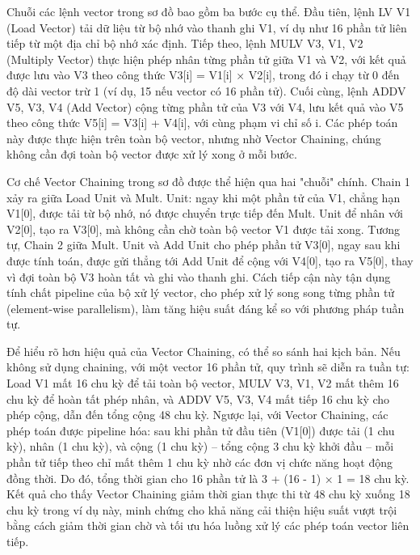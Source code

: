 \documentclass[a4paper]{article}
\begin{document}
Chuỗi các lệnh vector trong sơ đồ bao gồm ba bước cụ thể. Đầu tiên, lệnh LV V1 (Load Vector) tải dữ liệu từ bộ nhớ vào thanh ghi V1, ví dụ như 16 phần tử liên tiếp từ một địa chỉ bộ nhớ xác định. Tiếp theo, lệnh MULV V3, V1, V2 (Multiply Vector) thực hiện phép nhân từng phần tử giữa V1 và V2, với kết quả được lưu vào V3 theo công thức V3[i] = V1[i] × V2[i], trong đó i chạy từ 0 đến độ dài vector trừ 1 (ví dụ, 15 nếu vector có 16 phần tử). Cuối cùng, lệnh ADDV V5, V3, V4 (Add Vector) cộng từng phần tử của V3 với V4, lưu kết quả vào V5 theo công thức V5[i] = V3[i] + V4[i], với cùng phạm vi chỉ số i. Các phép toán này được thực hiện trên toàn bộ vector, nhưng nhờ Vector Chaining, chúng không cần đợi toàn bộ vector được xử lý xong ở mỗi bước.

Cơ chế Vector Chaining trong sơ đồ được thể hiện qua hai "chuỗi" chính. Chain 1 xảy ra giữa Load Unit và Mult. Unit: ngay khi một phần tử của V1, chẳng hạn V1[0], được tải từ bộ nhớ, nó được chuyển trực tiếp đến Mult. Unit để nhân với V2[0], tạo ra V3[0], mà không cần chờ toàn bộ vector V1 được tải xong. Tương tự, Chain 2 giữa Mult. Unit và Add Unit cho phép phần tử V3[0], ngay sau khi được tính toán, được gửi thẳng tới Add Unit để cộng với V4[0], tạo ra V5[0], thay vì đợi toàn bộ V3 hoàn tất và ghi vào thanh ghi. Cách tiếp cận này tận dụng tính chất pipeline của bộ xử lý vector, cho phép xử lý song song từng phần tử (element-wise parallelism), làm tăng hiệu suất đáng kể so với phương pháp tuần tự.

Để hiểu rõ hơn hiệu quả của Vector Chaining, có thể so sánh hai kịch bản. Nếu không sử dụng chaining, với một vector 16 phần tử, quy trình sẽ diễn ra tuần tự: Load V1 mất 16 chu kỳ để tải toàn bộ vector, MULV V3, V1, V2 mất thêm 16 chu kỳ để hoàn tất phép nhân, và ADDV V5, V3, V4 mất tiếp 16 chu kỳ cho phép cộng, dẫn đến tổng cộng 48 chu kỳ. Ngược lại, với Vector Chaining, các phép toán được pipeline hóa: sau khi phần tử đầu tiên (V1[0]) được tải (1 chu kỳ), nhân (1 chu kỳ), và cộng (1 chu kỳ) – tổng cộng 3 chu kỳ khởi đầu – mỗi phần tử tiếp theo chỉ mất thêm 1 chu kỳ nhờ các đơn vị chức năng hoạt động đồng thời. Do đó, tổng thời gian cho 16 phần tử là 3 + (16 - 1) × 1 = 18 chu kỳ. Kết quả cho thấy Vector Chaining giảm thời gian thực thi từ 48 chu kỳ xuống 18 chu kỳ trong ví dụ này, minh chứng cho khả năng cải thiện hiệu suất vượt trội bằng cách giảm thời gian chờ và tối ưu hóa luồng xử lý các phép toán vector liên tiếp.
\end{document}
